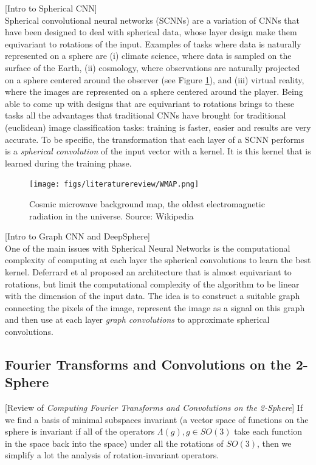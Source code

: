 [Intro to Spherical CNN]\\
Spherical convolutional neural networks (SCNNs) are a variation of CNNs that have been designed to deal with spherical data, whose layer design make them equivariant to rotations of the input.  Examples of tasks where data is naturally represented on a sphere are (i) climate science, where data is sampled on the surface of the Earth, (ii) cosmology, where observations are naturally projected on a sphere centered around the observer (see Figure \ref{fig:cosmicradiation}), and (iii) virtual reality, where the images are represented on a sphere centered around the player. Being able to come up with designs that are equivariant to rotations brings to these tasks all the advantages that traditional CNNs have brought for traditional (euclidean) image classification tasks: training is faster, easier and results are very accurate. To be specific, the transformation that each layer of a SCNN performs is a \textit{spherical convolution} of the input vector with a kernel. It is this kernel that is learned during the training phase. 

\begin{figure}
	\label{fig:cosmicradiation}
	\centering
	\caption{Cosmic microwave background map, the oldest electromagnetic radiation in the universe. Source: Wikipedia}
	\texttt{[image: figs/literaturereview/WMAP.png]}
\end{figure}

[Intro to Graph CNN and DeepSphere]\\
One of the main issues with Spherical Neural Networks is the computational complexity of computing at each layer the spherical convolutions to learn the best kernel. Deferrard et al \cite{DeepSphere} proposed an architecture that is almost equivariant to rotations, but limit the computational complexity of the algorithm to be linear with the dimension of the input data. The idea is to construct a suitable graph connecting the pixels of the image, represent the image as a signal on this graph and then use at each layer \textit{graph convolutions} to approximate spherical convolutions.
\subsection{Fourier Transforms and Convolutions on the 2-Sphere}
[Review of \textit{Computing Fourier Transforms and Convolutions on the 2-Sphere}]
If we find a basis of minimal subspaces invariant (a vector space of functions on the sphere is invariant if all of the operators $\Lambda(g), g\in SO(3)$ take each function in the space back into the space) under all the rotations of $SO(3)$, then we simplify a lot the analysis of rotation-invariant operators.
